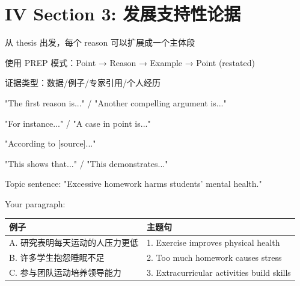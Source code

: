 \documentclass[12pt]{ctexart}
\begin{document}
\section*{IV Section 3: 发展支持性论据}

\begin{writingscaffold}
  \structureguide
    \item 从 thesis 出发，每个 reason 可以扩展成一个主体段
    \item 使用 PREP 模式：Point → Reason → Example → Point (restated)
    \item 证据类型：数据/例子/专家引用/个人经历
  \endsstructureguide
  
  \usefullanguage
    \item "The first reason is..." / "Another compelling argument is..."
    \item "For instance..." / "A case in point is..."
    \item "According to [source]..."
    \item "This shows that..." / "This demonstrates..."
  \endusefullanguage
  
  \begin{exercises}
    
    Topic sentence: "Excessive homework harms students' mental health."
    
    Your paragraph:
    \ansspace[15cm]
    
    
    \begin{tabular}{|l|l|}
    \hline
    \textbf{例子} & \textbf{主题句} \\
    \hline
    A. 研究表明每天运动的人压力更低 & 1. Exercise improves physical health \\
    B. 许多学生抱怨睡眠不足 & 2. Too much homework causes stress \\
    C. 参与团队运动培养领导能力 & 3. Extracurricular activities build skills \\
    \hline
    \end{tabular}
    \ansspace[6cm]
  \end{exercises}
\end{writingscaffold}
\end{document}
